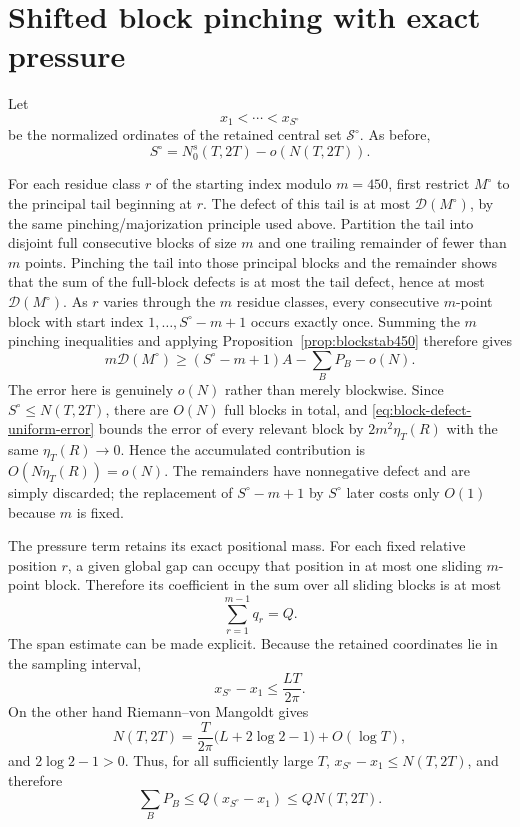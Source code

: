 \documentclass[11pt]{article}
\begin{document}
\section{Shifted block pinching with exact pressure}\label{sec:pinching}

Let
\[
 x_1<\cdots<x_{S^\circ}
\]
be the normalized ordinates of the retained central set
\(\mathcal S^\circ\).  As before,
\[
 S^\circ=N_0^s(T,2T)-o(N(T,2T)).
\]

For each residue class \(r\) of the starting index modulo \(m=450\),
first restrict \(M^\circ\) to the principal tail beginning at \(r\).  The
defect of this tail is at most \(\mathcal D(M^\circ)\), by the same
pinching/majorization principle used above.  Partition the tail into disjoint
full consecutive blocks of size \(m\) and one trailing remainder of fewer than
\(m\) points.  Pinching the tail into those principal blocks and the remainder
shows that the sum of the full-block defects is at most the tail defect, hence
at most \(\mathcal D(M^\circ)\).  As \(r\) varies through the \(m\) residue
classes, every consecutive \(m\)-point block with start index
\(1,\ldots,S^\circ-m+1\) occurs exactly once.  Summing the \(m\)
pinching inequalities and applying Proposition~\ref{prop:blockstab450}
therefore gives
\begin{equation}\label{eq:shifted-exact}
 m\mathcal D(M^\circ)
 \ge
 (S^\circ-m+1)A
 -\sum_BP_B
 -o(N).
\end{equation}
The error here is genuinely $o(N)$ rather than merely blockwise.  Since
\(S^\circ\le N(T,2T)\), there are $O(N)$ full blocks in total, and
\eqref{eq:block-defect-uniform-error} bounds the error of every relevant
block by $2m^2\eta_T(R)$ with the same \(\eta_T(R)\to0\).  Hence the
accumulated contribution is $O(N\eta_T(R))=o(N)$.  The remainders have
nonnegative defect and are simply discarded; the replacement of
\(S^\circ-m+1\) by \(S^\circ\) later costs only $O(1)$ because \(m\)
is fixed.

The pressure term retains its exact positional mass.  For each fixed relative
position \(r\), a given global gap can occupy that position in at most one
sliding \(m\)-point block.  Therefore its coefficient in the sum over all
sliding blocks is at most
\[
 \sum_{r=1}^{m-1}q_r=Q.
\]
The span estimate can be made explicit.  Because the retained coordinates
lie in the sampling interval,
\[
 x_{S^\circ}-x_1\le\frac{LT}{2\pi}.
\]
On the other hand Riemann--von Mangoldt gives
\[
 N(T,2T)=\frac{T}{2\pi}
 \bigl(L+2\log2-1\bigr)+O(\log T),
\]
and $2\log2-1>0$.  Thus, for all sufficiently large $T$,
\(x_{S^\circ}-x_1\le N(T,2T)\), and therefore
\begin{equation}\label{eq:pressure-global}
 \sum_BP_B
 \le Q(x_{S^\circ}-x_1)
 \le QN(T,2T).
\end{equation}
\end{document}
